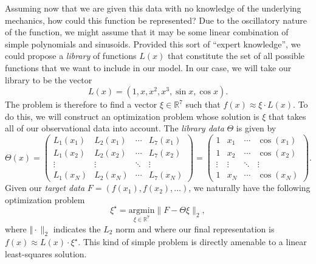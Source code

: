 \documentclass[
]{article}
\begin{document}
Assuming now that we are given this data with no knowledge of the
underlying mechanics, how could this function be represented? Due to the
oscillatory nature of the function, we might assume that it may be some
linear combination of simple polynomials and sinusoids. Provided this
sort of ``expert knowledge'', we could propose a \emph{library} of
functions \(L(x)\) that constitute the set of all possible functions
that we want to include in our model. In our case, we will take our
library to be the vector \begin{equation}
L(x) = (1, x, x^2, x^3, \sin x, \cos x).
\end{equation} The problem is therefore to find a vector
\(\xi \in \mathbb{R}^7\) such that \(f(x) \approx \xi \cdot L(x)\). To
do this, we will construct an optimization problem whose solution is
\(\xi\) that takes all of our observational data into account. The
\emph{library data} \(\Theta\) is given by \begin{equation}
\Theta(x) 
= 
\begin{pmatrix}
L_1(x_1) & L_2(x_1) & \cdots & L_7(x_1) \\ 
L_1(x_2) & L_2(x_2) & \cdots & L_7(x_2) \\
\vdots   & \vdots   & \ddots & \vdots   \\
L_1(x_N) & L_2(x_N) & \cdots & L_7(x_N) 
\end{pmatrix}
=
\begin{pmatrix}
1 & x_1 & \cdots & \cos(x_1) \\ 
1 & x_2 & \cdots & \cos(x_2) \\
\vdots   & \vdots   & \ddots & \vdots   \\
1 & x_N & \cdots & \cos(x_N) 
\end{pmatrix}.
\end{equation} Given our \emph{target data}
\(F = (f(x_1), f(x_2), \dots)\), we naturally have the following
optimization problem \begin{equation}
\xi^\star = \underset{\xi \in \mathbb{R}^7}{\text{argmin}} \lVert F - \Theta \xi \rVert_{2} ,
\end{equation} where \(\Vert\cdot\rVert_2\) indicates the \(L_2\) norm
and where our final representation is
\(f(x) \approx L(x) \cdot \xi^\star\). This kind of simple problem is
directly amenable to a linear least-squares solution.
\end{document}
